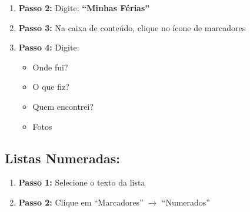 \documentclass[11pt]{article}
\begin{document}
\begin{multicols}{2}
\begin{enumerate}
\item \textbf{Passo 2:} Digite: \textbf{``Minhas Férias''}

\item \textbf{Passo 3:} Na caixa de conteúdo, clique no ícone de marcadores

\item \textbf{Passo 4:} Digite:
\begin{itemize}
\item Onde fui?
\item O que fiz?
\item Quem encontrei?
\item Fotos
\end{itemize}
\end{enumerate}

\subsection*{Listas Numeradas:}
\begin{enumerate}
\item \textbf{Passo 1:} Selecione o texto da lista
\item \textbf{Passo 2:} Clique em ``Marcadores'' $\rightarrow$ ``Numerados''
\end{enumerate}

\end{multicols}
\end{document}
